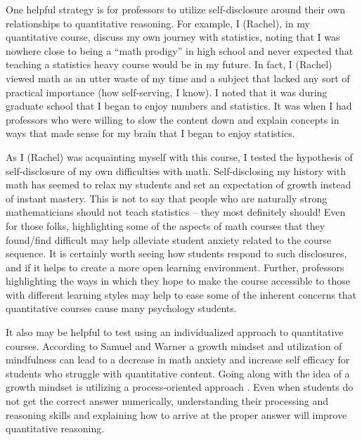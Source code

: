 \documentclass[
  11pt,
]{book}
\begin{document}
One helpful strategy is for professors to utilize self-disclosure around their own relationships to quantitative reasoning. For example, I (Rachel), in my quantitative course, discuss my own journey with statistics, noting that I was nowhere close to being a ``math prodigy'' in high school and never expected that teaching a statistics heavy course would be in my future. In fact, I (Rachel) viewed math as an utter waste of my time and a subject that lacked any sort of practical importance (how self-serving, I know). I noted that it was during graduate school that I began to enjoy numbers and statistics. It was when I had professors who were willing to slow the content down and explain concepts in ways that made sense for my brain that\citep{anderson_impact_1981, williams_statistics_2010} I began to enjoy statistics.

As I (Rachel) was acquainting myself with this course, I tested the hypothesis of self-disclosure of my own difficulties with math. Self-disclosing my history with math has seemed to relax my students and set an expectation of growth instead of instant mastery. This is not to say that people who are naturally strong mathematicians should not teach statistics -- they most definitely should! Even for those folks, highlighting some of the aspects of math courses that they found/find difficult may help alleviate student anxiety related to the course sequence. It is certainly worth seeing how students respond to such disclosures, and if it helps to create a more open learning environment. Further, professors highlighting the ways in which they hope to make the course accessible to those with different learning styles may help to ease some of the inherent concerns that quantitative courses cause many psychology students.

It also may be helpful to test using an individualized approach to quantitative courses. According to Samuel and Warner \citeyearpar{samuel_i_2021} a growth mindset and utilization of mindfulness can lead to a decrease in math anxiety and increase self efficacy for students who struggle with quantitative content. Going along with the idea of a growth mindset is utilizing a process-oriented approach \citep{noauthor_teaching_nodate}. Even when students do not get the correct answer numerically, understanding their processing and reasoning skills and explaining how to arrive at the proper answer will improve quantitative reasoning.
\end{document}
